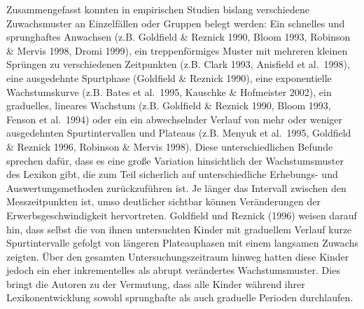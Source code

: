 \documentclass[
  letterpaper,
]{scrbook}
\begin{document}
Zusammengefasst konnten in empirischen Studien bislang verschiedene
Zuwachsmuster an Einzelfällen oder Gruppen belegt werden: Ein schnelles
und sprunghaftes Anwachsen (z.B. Goldfield \& Reznick 1990, Bloom 1993,
Robinson \& Mervis 1998, Dromi 1999), ein treppenförmiges Muster mit
mehreren kleinen Sprüngen zu verschiedenen Zeitpunkten (z.B. Clark 1993,
Anisfield et al.~1998), eine ausgedehnte Spurtphase (Goldfield \&
Reznick 1990), eine exponentielle Wachstumskurve (z.B. Bates et
al.~1995, Kauschke \& Hofmeister 2002), ein graduelles, lineares
Wachstum (z.B. Goldfield \& Reznick 1990, Bloom 1993, Fenson et
al.~1994) oder ein ein abwechselnder Verlauf von mehr oder weniger
ausgedehnten Spurtintervallen und Plateaus (z.B. Menyuk et al.~1995,
Goldfield \& Reznick 1996, Robinson \& Mervis 1998). Diese
unterschiedlichen Befunde sprechen dafür, dass es eine große Variation
hinsichtlich der Wachstumsmuster des Lexikon gibt, die zum Teil
sicherlich auf unterschiedliche Erhebungs- und Auswertungsmethoden
zurückzuführen ist. Je länger das Intervall zwischen den Messzeitpunkten
ist, umso deutlicher sichtbar können Veränderungen der
Erwerbsgeschwindigkeit hervortreten. Goldfield und Reznick (1996) weisen
darauf hin, dass selbst die von ihnen untersuchten Kinder mit graduellem
Verlauf kurze Spurtintervalle gefolgt von längeren Plateauphasen mit
einem langsamen Zuwachs zeigten. Über den gesamten Untersuchungszeitraum
hinweg hatten diese Kinder jedoch ein eher inkrementelles als abrupt
verändertes Wachstumsmuster. Dies bringt die Autoren zu der Vermutung,
dass alle Kinder während ihrer Lexikonentwicklung sowohl sprunghafte als
auch graduelle Perioden durchlaufen.
\end{document}
